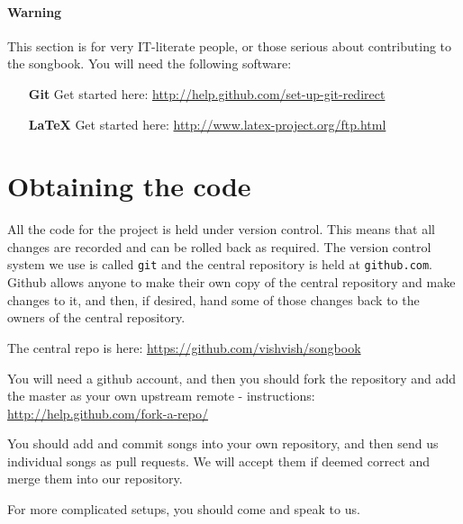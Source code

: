 \documentclass[10pt,a4paper]{book}
\begin{document}
\paragraph{Warning} %
\label{par:warning}

This section is for very IT-literate people, or those serious about contributing to the songbook. You will need the following software:

\begin{itemize}
	\item[\textbf{Git}]Get started here: \url{http://help.github.com/set-up-git-redirect}
	\item[\textbf{LaTeX}]Get started here: \url{http://www.latex-project.org/ftp.html}
\end{itemize}

\section{Obtaining the code} %
\label{sec:obtaining_the_code}

All the code for the project is held under version control. This means that all changes are recorded and can be rolled back as required. The version control system we use is called \texttt{git} and the central repository is held at \texttt{github.com}. Github allows anyone to make their own copy of the central repository and make changes to it, and then, if desired, hand some of those changes back to the owners of the central repository.

The central repo is here: \url{https://github.com/vishvish/songbook}

You will need a github account, and then you should fork the repository and add the master as your own upstream remote - instructions: \url{http://help.github.com/fork-a-repo/}

You should add and commit songs into your own repository, and then send us individual songs as pull requests. We will accept them if deemed correct and merge them into our repository.

For more complicated setups, you should come and speak to us.



\end{document}

